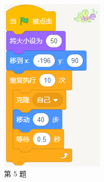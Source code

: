 \documentclass[10pt, a4paper]{article}
\begin{document}
\begin{enumerate}
\begin{figure}[htbp]
\begin{minipage}[t]{.33\textwidth}
\begin{minipage}[t]{.32\textwidth}
                    \includegraphics[width=\textwidth]{figure/5-2.png}
                \end{minipage}
                \caption*{第 5 题}
            \end{minipage}
            \begin{minipage}[t]{.23\textwidth}
                \centering

\end{minipage}
\end{figure}
\end{enumerate}
\end{document}
